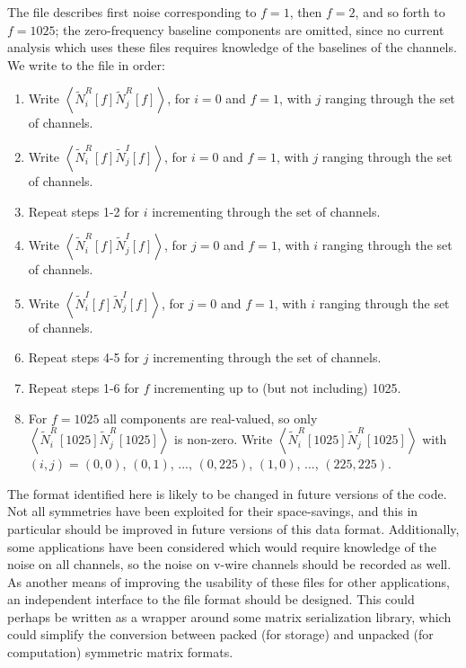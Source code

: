 The file describes first noise corresponding to $f = 1$, then $f = 2$, and so forth to $f = 1025$; the zero-frequency baseline components are omitted, since no current analysis which uses these files requires knowledge of the baselines of the channels.  We write to the file in order:
\begin{enumerate}
\item Write $\left<\widetilde{N}^R_i[f] \widetilde{N}^R_j[f]\right>$, for $i = 0$ and $f = 1$, with $j$ ranging through the set of channels.
\item Write $\left<\widetilde{N}^R_i[f] \widetilde{N}^I_j[f]\right>$, for $i = 0$ and $f = 1$, with $j$ ranging through the set of channels.
\item Repeat steps 1-2 for $i$ incrementing through the set of channels.
\item Write $\left<\widetilde{N}^R_i[f] \widetilde{N}^I_j[f]\right>$, for $j = 0$ and $f = 1$, with $i$ ranging through the set of channels.
\item Write $\left<\widetilde{N}^I_i[f] \widetilde{N}^I_j[f]\right>$, for $j = 0$ and $f = 1$, with $i$ ranging through the set of channels.
\item Repeat steps 4-5 for $j$ incrementing through the set of channels.
\item Repeat steps 1-6 for $f$ incrementing up to (but not including) 1025.
\item For $f = 1025$ all components are real-valued, so only $\left<\widetilde{N}^R_i[1025] \widetilde{N}^R_j[1025]\right>$ is non-zero.  Write $\left<\widetilde{N}^R_i[1025] \widetilde{N}^R_j[1025]\right>$ with $(i,j) = (0,0)$, $(0,1)$, ..., $(0,225)$, $(1,0)$, ..., $(225,225)$.
\end{enumerate}

The format identified here is likely to be changed in future versions of the code.  Not all symmetries have been exploited for their space-savings, and this in particular should be improved in future versions of this data format.  Additionally, some applications have been considered which would require knowledge of the noise on all channels, so the noise on v-wire channels should be recorded as well.  As another means of improving the usability of these files for other applications, an independent interface to the file format should be designed.  This could perhaps be written as a wrapper around some matrix serialization library, which could simplify the conversion between packed (for storage) and unpacked (for computation) symmetric matrix formats.

